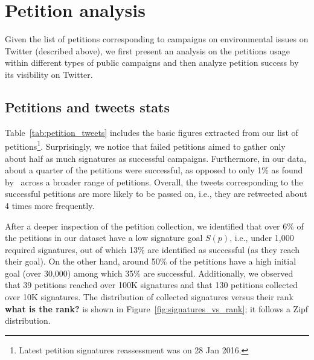 \section{Petition analysis}
\label{sec:petition_analysis}

Given the list of petitions corresponding to campaigns on environmental issues on Twitter (described above), we first present an analysis on the petitions usage within different types of public campaigns and then analyze petition success by its visibility on Twitter.

\subsection{Petitions and tweets stats}
Table~\ref{tab:petition_tweets} includes the basic figures extracted from our list of petitions\footnote{Latest petition signatures reassessment was on 28 Jan 2016.}.
Surprisingly, we notice that failed petitions aimed to gather only about half as much signatures as successful campaigns.
Furthermore, in our data, about a quarter of the petitions were successful, as opposed to only 1\% as found by~\citeauthor{Huang2015}  across a broader range of petitions.
Overall, the tweets corresponding to the successful petitions are more likely to be passed on, i.e., they are retweeted about 4 times more frequently.

After a deeper inspection of the petition collection, we identified that over 6\% of the petitions in our dataset have a low signature goal $S(p)$, i.e., under 1,000 required signatures, out of which 13\% are identified as successful (as they reach their goal).
On the other hand, around 50\% of the petitions have a high initial goal (over 30,000) among which 35\% are successful.
Additionally, we observed that 39 petitions reached over 100K signatures and that 130 petitions collected over 10K signatures.
The distribution of collected signatures versus their rank {\bf what is the rank?} is shown in Figure~\ref{fig:signatures_vs_rank}; it follows a Zipf distribution.

